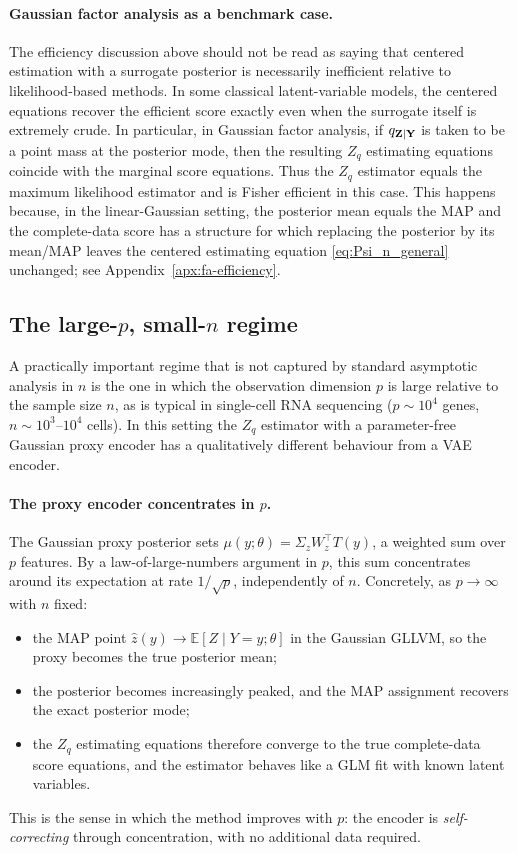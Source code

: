 \documentclass[twoside,11pt]{article}
\begin{document}
\paragraph{Gaussian factor analysis as a benchmark case.}
The efficiency discussion above should not be read as saying that centered estimation with a surrogate posterior is necessarily inefficient relative to likelihood-based methods. In some classical latent-variable models, the centered equations recover the efficient score exactly even when the surrogate itself is extremely crude. In particular, in Gaussian factor analysis, if \(q_{{\bf Z}\mid{\bf Y}}\) is taken to be a point mass at the posterior mode, then the resulting \(Z_q\) estimating equations coincide with the marginal score equations. Thus the \(Z_q\) estimator equals the maximum likelihood estimator and is Fisher efficient in this case. This happens because, in the linear-Gaussian setting, the posterior mean equals the MAP and the complete-data score has a structure for which replacing the posterior by its mean/MAP leaves the centered estimating equation \eqref{eq:Psi_n_general} unchanged; see Appendix~\ref{apx:fa-efficiency}.



\subsection{The large-\texorpdfstring{$p$}{p}, small-\texorpdfstring{$n$}{n} regime}
\label{sec:large-p}

A practically important regime that is not captured by standard asymptotic analysis in $n$ is the one in which the observation dimension $p$ is large relative to the sample size $n$, as is typical in single-cell RNA sequencing ($p \sim 10^4$ genes, $n \sim 10^3$--$10^4$ cells).
In this setting the $Z_q$ estimator with a parameter-free Gaussian proxy encoder has a qualitatively different behaviour from a VAE encoder.

\paragraph{The proxy encoder concentrates in $p$.}
The Gaussian proxy posterior sets $\mu(y;\theta) = \Sigma_z W_z^\top T(y)$, a weighted sum over $p$ features. By a law-of-large-numbers argument in $p$, this sum concentrates around its expectation at rate $1/\sqrt{p}$, independently of $n$. Concretely, as $p\to\infty$ with $n$ fixed:
\begin{itemize}
  \item the MAP point $\hat z(y) \to \mathbb{E}[Z \mid Y = y; \theta]$ in the Gaussian GLLVM, so the proxy becomes the true posterior mean;
  \item the posterior becomes increasingly peaked, and the MAP assignment recovers the exact posterior mode;
  \item the $Z_q$ estimating equations therefore converge to the true complete-data score equations, and the estimator behaves like a GLM fit with known latent variables.
\end{itemize}
This is the sense in which the method improves with $p$: the encoder is \emph{self-correcting} through concentration, with no additional data required.
\end{document}
